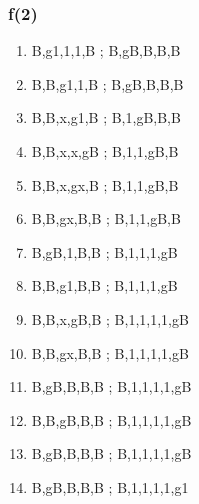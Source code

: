 \documentclass[leqno]{article}
\begin{document}
            \subsubsection{f(2)}
                \begin{enumerate}
                    \item {}       {B,g1,1,1,B ; B,gB,B,B,B}
                    \item {}        {B,B,g1,1,B ; B,gB,B,B,B}
                    \item {}       {B,B,x,g1,B ; B,1,gB,B,B}
                    \item {}     {B,B,x,x,gB ; B,1,1,gB,B}
                    \item {}      {B,B,x,gx,B ; B,1,1,gB,B}
                    \item {}       {B,B,gx,B,B ; B,1,1,gB,B}
                    \item {}     {B,gB,1,B,B ; B,1,1,1,gB}
                    \item {}      {B,B,g1,B,B ; B,1,1,1,gB}
                    \item {}    {B,B,x,gB,B ; B,1,1,1,1,gB}
                    \item {}     {B,B,gx,B,B ; B,1,1,1,1,gB}
                    \item {}  {B,gB,B,B,B ; B,1,1,1,1,gB}
                    \item {}  {B,B,gB,B,B ; B,1,1,1,1,gB}
                    \item {}  {B,gB,B,B,B ; B,1,1,1,1,gB}
                    \item {}  {B,gB,B,B,B ; B,1,1,1,1,g1}
                \end{enumerate}
\end{document}
